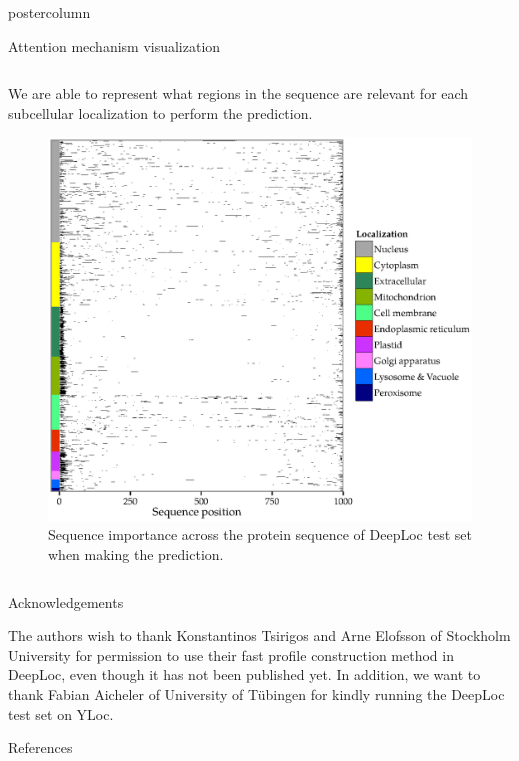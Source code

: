 ﻿\documentclass[final,hyperref={pdfpagelabels=false}]{beamer}
\begin{document}
\begin{frame}
\begin{columns}
\begin{column}{.49\paperwidth}
\begin{beamercolorbox}[center,wd=\textwidth]{postercolumn}
\begin{minipage}[T]{.99\textwidth}
{\begin{block}{Attention mechanism visualization}
\begin{columns}
\begin{column}{1\textwidth}
\centering

\centering
\begin{minipage}[t]{.95\textwidth}


\vspace{-0.5cm}

\small{We are able to represent what regions in the sequence are relevant for each subcellular localization to perform the prediction.}

\vspace{0.4cm}
\begin{figure}
\centering
\includegraphics[width=0.9\linewidth]{Sequence_importance.eps}
 \caption{Sequence importance across the protein sequence of DeepLoc test set when making the prediction.}
\end{figure}  


\end{minipage}

\end{column}
\end{columns}
\end{block}	

\vfill

\begin{block}{Acknowledgements}
\centering
\begin{minipage}[t]{0.98\textwidth}

\small{The authors wish to thank Konstantinos Tsirigos and Arne Elofsson of Stockholm University for permission to use their fast profile construction method in DeepLoc, even though it has not been published yet. In addition, we want to thank Fabian Aicheler of University of Tübingen for kindly running the DeepLoc test set on YLoc.}
\end{minipage}
\end{block}
\vfill
\begin{block}{References}


\end{block}}
\end{minipage}
\end{beamercolorbox}
\end{column}
\end{columns}
\end{frame}
\end{document}
